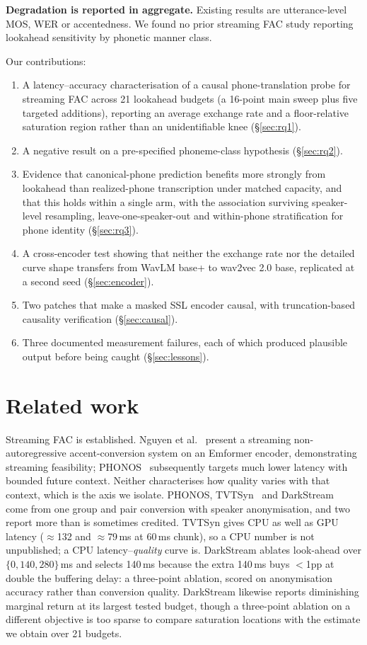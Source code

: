 \documentclass[journal]{IEEEtran}
\begin{document}
\textbf{Degradation is reported in aggregate.} Existing results are
utterance-level MOS, WER or accentedness. We found no prior streaming FAC study
reporting lookahead sensitivity by phonetic manner class.

Our contributions:
\begin{enumerate}\itemsep1pt
\item A latency--accuracy characterisation of a causal phone-translation probe
      for streaming FAC across 21 lookahead budgets (a 16-point main sweep
      plus five targeted additions), reporting an average
      exchange rate and a floor-relative saturation region rather than an
      unidentifiable knee (\S\ref{sec:rq1}).
\item A negative result on a pre-specified phoneme-class hypothesis
      (\S\ref{sec:rq2}).
\item Evidence that canonical-phone prediction benefits more strongly from
      lookahead than realized-phone transcription under matched capacity, and
      that this holds within a single arm, with the association surviving
      speaker-level resampling, leave-one-speaker-out and within-phone
      stratification for
      phone identity (\S\ref{sec:rq3}).
\item A cross-encoder test showing that neither the exchange rate nor the
      detailed curve shape transfers from WavLM base+ to wav2vec 2.0 base,
      replicated at a second seed (\S\ref{sec:encoder}).
\item Two patches that make a masked SSL encoder causal, with
      truncation-based causality verification (\S\ref{sec:causal}).
\item Three documented measurement failures, each of which produced plausible
      output before being caught (\S\ref{sec:lessons}).
\end{enumerate}

\section{Related work}

Streaming FAC is established. Nguyen et al.~\cite{nguyen2025streaming} present
a streaming non-autoregressive accent-conversion system on an Emformer encoder,
demonstrating streaming feasibility; PHONOS~\cite{phonos2026}
subsequently targets much lower latency with bounded future context. Neither
characterises how quality varies with that context, which is the axis we
isolate. PHONOS, TVTSyn~\cite{tvtsyn2026} and DarkStream~\cite{darkstream2025}
come from one group and pair conversion with speaker anonymisation, and two
report more than is sometimes credited. TVTSyn gives CPU as well as GPU latency
($\approx$132 and $\approx$79\,ms at 60\,ms chunk), so a CPU number is not
unpublished; a CPU latency--\emph{quality} curve is. DarkStream ablates
look-ahead over $\{0,140,280\}$\,ms and selects 140\,ms because the extra
140\,ms buys $<$1pp at double the buffering delay: a three-point ablation,
scored on anonymisation accuracy rather than conversion quality. DarkStream
likewise reports diminishing marginal return at its largest tested budget,
though a three-point ablation on a different objective is too sparse to compare
saturation locations with the estimate we obtain over 21 budgets.
\end{document}

